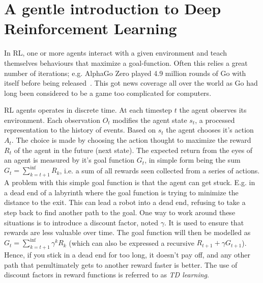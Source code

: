 \documentclass[10pt,twocolumn,letterpaper]{article}
\begin{document}
\section{A gentle introduction to Deep Reinforcement Learning}\label{sec:drl}

In \gls{RL}, one or more agents interact with a given environment and teach themselves 
behaviours that maximize a goal-function. Often this relies a great number of iterations; e.g. AlphaGo Zero played 4.9 million rounds of Go with itself before being released~\cite{goWithoutHumans}. This got news coverage all over the world as Go had long been considered to be a game too complicated for computers.

\gls{RL} agents operates in discrete time. At each timestep $t$ the agent observes its environment. Each observation $O_{t}$ modifies the agent state $s_{t}$, a processed representation to the history of events. Based on $s_{t}$ the agent chooses it's action $A_{t}$. The choice is made by choosing the action thought to maximize the reward $R_{t}$ of the agent in the future (next state). The expected return from the eyes of an agent is measured by it's goal function $G_{t}$, in simple form being the sum $G_{t} = \sum_{k=t+1}^{\inf{}}{R_{k}}$, i.e. a sum of all rewards seen collected from a series of actions. A problem with this simple goal function is that the agent can get stuck. E.g. in a dead end of a labyrinth where the goal function is trying to minimize the distance to the exit. This can lead a robot into a dead end, refusing to take a step back to find another path to the goal. One way to work around these situations is to introduce a discount factor, noted $\gamma{}$. It is used to ensure that rewards are less valuable over time. The goal function will then be modelled as $G_{t} = \sum_{k=t+1}^{\inf{}}\gamma^{k}{R_{k}}$ (which can also be expressed a recursive $R_{t+1} + \gamma{G_{t+1}}$). Hence, if you stick in a dead end for too long, it doesn't pay off, and any other path that penultimately gets to another reward faster is better. The use of discount factors in reward functions is referred to as \textit{\gls{TD} learning}.
\end{document}
